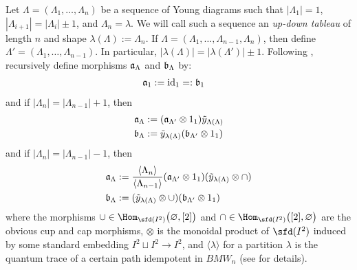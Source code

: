 Let $\Lambda = (\Lambda_1, \dots, \Lambda_n)$ be a sequence of Young diagrams such that $|\Lambda_1|=1$, $|\Lambda_{i+1}| = |\Lambda_{i}| \pm 1$, and $\Lambda_n=\lambda$. 
We will call such a sequence an \textit{up-down tableau} of length $n$ and shape $\lambda(\Lambda) := \Lambda_n$. 
If $\Lambda = (\Lambda_1, \dots, \Lambda_{n-1}, \Lambda_n)$, then define $\Lambda' = (\Lambda_1, \dots, \Lambda_{n-1})$. 
In particular, $|\lambda(\Lambda)| = |\lambda(\Lambda')| \pm 1$. Following \cite{BB01}, recursively define morphisms $\mathfrak{a}_\Lambda$ and $\mathfrak{b}_\Lambda$ by:
\begin{align*}
    \mathfrak{a}_1 &:= {\rm{id}}_1 =: \mathfrak{b}_1 
\end{align*}
and if $|\Lambda_n| = |\Lambda_{n-1}| + 1$, then 
\begin{align*}
    \mathfrak{a}_\Lambda &:= (\mathfrak{a}_{\Lambda'} \otimes 1_1) \tilde{y}_{\Lambda(\Lambda)} \\
    \mathfrak{b}_\Lambda &:= \tilde{y}_{\lambda(\Lambda)} (\mathfrak{b}_{\Lambda'} \otimes 1_1)
\end{align*}
and if $|\Lambda_n| = |\Lambda_{n-1}| - 1$, then
\begin{align*}
    \mathfrak{a}_\Lambda &:= \frac{ \langle \Lambda_n \rangle}{ \langle \Lambda_{n-1} \rangle} (\mathfrak{a}_{\Lambda'} \otimes 1_1) (\tilde{y}_{\lambda(\Lambda)} \otimes \cap) \\
    \mathfrak{b}_\Lambda &:= (\tilde{y}_{\lambda(\Lambda)} \otimes \cup) (\mathfrak{b}_{\Lambda'} \otimes 1_1)
\end{align*}
where the morphisms $\cup \in \Hom_{\sfd(I^2)} \big( \varnothing, [2] \big)$ and $\cap \in \Hom_{\sfd(I^2)} \big( [2], \varnothing \big)$ are the obvious cup and cap morphisms, $\otimes$ is the monoidal product of $\sfd(I^2)$ induced by some standard embedding $I^2 \sqcup I^2 \to I^2$, and $\langle \lambda \rangle$ for a partition $\lambda$ is the quantum trace of a certain path idempotent in $BMW_n$ (see \cite{BB01} for details). 


